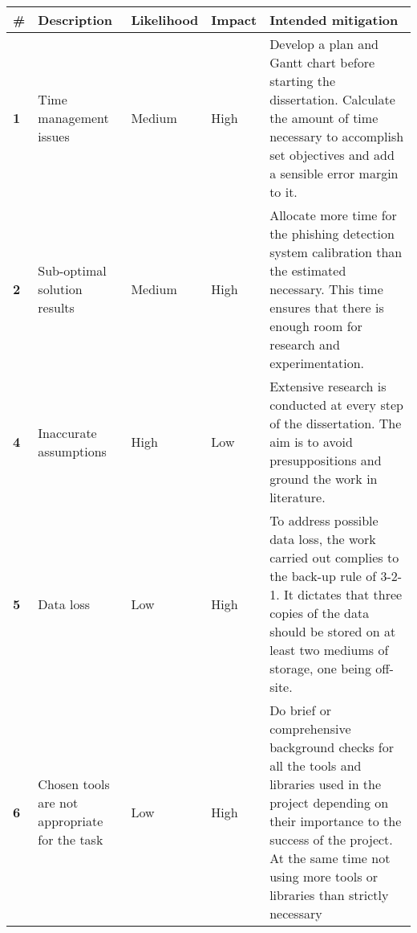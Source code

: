 \begin{singlespace}
	\begin{center}
		\label{tab:RISK_ANALYSIS}
		\begin{tabular}{ | m{0.5em} | m{7em} | m{5em} | m{3.2em}| m{17.5em} | }
			\hline
			\textbf{\#} & \textbf{Description} & \textbf{Likelihood} & \textbf{Impact} & \textbf{Intended mitigation}                                                                                                                                \\
			\hline
			\textbf{1}  &
			Time management issues
			            &
			Medium
			            &
			High
			            &
			Develop a plan and Gantt chart before starting the dissertation. Calculate the amount of time necessary to accomplish set objectives and add a sensible error margin to it.                                                              \\
			\hline
			\textbf{2}  &
			Sub-optimal solution results
			            &
			Medium
			            &
			High
			            &

			Allocate more time for the phishing detection system calibration than the estimated necessary. This time ensures that there is enough room for research and experimentation.                                                             \\
			\hline
			\textbf{4}  &
			Inaccurate assumptions
			            &
			High
			            &
			Low
			            &

			Extensive research is conducted at every step of the dissertation. The aim is to avoid presuppositions and ground the work in literature.                                                                                                \\
			\hline
			\textbf{5}  &
			Data loss
			            &
			Low
			            &
			High
			            &
			To address possible data loss, the work carried out complies to the back-up rule of 3-2-1. It dictates that three copies of the data should be stored on at least two mediums of storage, one being off-site.                            \\

			\hline
			\textbf{6}  &
			Chosen tools are not appropriate for the task
			            &
			Low
			            &
			High
			            &
			Do brief or comprehensive background checks for all the tools and
			libraries used in the project depending on their importance to the
			success of the project. At the same time not using more tools or
			libraries than strictly necessary                                                                                                                                                                                                        \\
			\hline


\end{tabular}
\end{center}
\end{singlespace}

